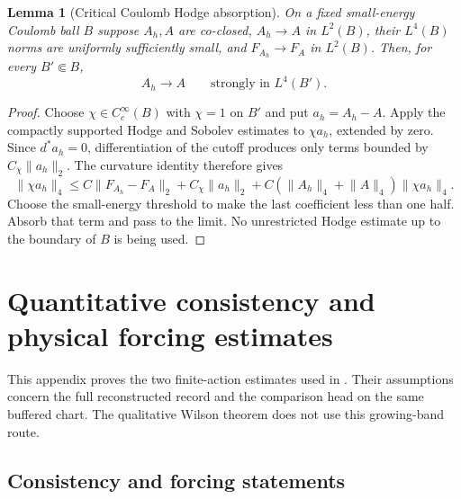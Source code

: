 \documentclass[11pt]{article}
\numberwithin{equation}{section}
\newtheorem{lemma}[lemma]{Lemma}
\theoremstyle{definition}
\theoremstyle{remark}
\newcommand{\norm}[1]{\lVert#1\rVert}
\begin{document}
\begin{lemma}[Critical Coulomb Hodge absorption]
\label{lem:critical-Coulomb-Hodge}
On a fixed small-energy Coulomb ball $B$ suppose $A_h,A$ are co-closed,
$A_h\to A$ in $L^2(B)$, their $L^4(B)$ norms are uniformly sufficiently
small, and $F_{A_h}\to F_A$ in $L^2(B)$.  Then, for every $B'\Subset B$,
\begin{equation}
 A_h\to A\qquad\text{strongly in }L^4(B').
 \label{eq:critical-A4-strong}
\end{equation}
\end{lemma}
\begin{proof}
Choose $\chi\in C_c^\infty(B)$ with $\chi=1$ on $B'$ and put
$a_h=A_h-A$.  Apply the compactly supported Hodge and Sobolev estimates to
$\chi a_h$, extended by zero.  Since $d^*a_h=0$, differentiation of the
cutoff produces only terms bounded by $C_\chi\norm{a_h}_2$.
The curvature identity therefore gives
\[
 \norm{\chi a_h}_4
 \le C\norm{F_{A_h}-F_A}_2+C_\chi\norm{a_h}_2
      +C(\norm{A_h}_4+\norm A_4)\norm{\chi a_h}_4.
\]
Choose the small-energy threshold to make the last coefficient less than
one half.  Absorb that term and pass to the limit.  No unrestricted Hodge
estimate up to the boundary of $B$ is being used.
\end{proof}

\section{Quantitative consistency and physical forcing estimates}
\label{app:quantitative-residuals}

This appendix proves the two finite-action estimates used in
. Their assumptions concern the full reconstructed
record and the comparison head on the same buffered chart. The qualitative
Wilson theorem does not use this growing-band route.

\subsection{Consistency and forcing statements}
\end{document}

